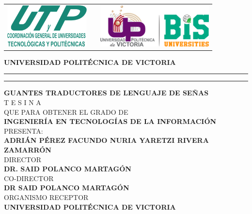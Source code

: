 \documentclass[12pt]{article}
\date{\specialdate\today}
\newcommand{\HRule}{\rule{\linewidth}{0.25mm}}
\newcommand{\ncarrera}            {Ingeniería en Tecnologías de la Información}
\newcommand{\nasesorinstitucional}{DR. SAID POLANCO MARTAGÓN}
\newcommand{\NombreAlumno}{ADRIÁN PÉREZ FACUNDO \newline NURIA YARETZI RIVERA ZAMARRÓN}
\newcommand{\NombreProyecto}{Guantes traductores de lenguaje de señas}
\newcommand{\organismoreceptor}   {Universidad Politécnica de Victoria}
\newcommand{\nasesorempresaria}   {DR SAID POLANCO MARTAGÓN}
\newcommand{\separacionCorta}{0.0cm}
\newcommand{\separacionLarga}{0.5cm}
\newcommand{\iemph}[1]{\MakeTextUppercase{#1}}
\begin{document}
\setcounter{page}{1}
\thispagestyle{empty}
\begin{center}
\begin{tabular}{cp{5cm}c}
\includegraphics[height=2.25cm]{UTYP.png} & 
& \includegraphics[height=2.25cm]{LogoUPV_2023.png}   \\
\end{tabular}
\Large \textbf{UNIVERSIDAD POLITÉCNICA DE VICTORIA}
\vspace{0.5cm}
\hrule
\vspace{0.1cm} 
\hrule
\vspace{0.5cm}
\textbf{\iemph{\NombreProyecto}} \\[\separacionLarga]
T E S I N A \\
QUE PARA OBTENER EL GRADO DE \\
\textbf{\iemph{\ncarrera}} \\[\separacionLarga]

PRESENTA: \\[\separacionCorta]
\textbf{\iemph{\NombreAlumno}}\\[\separacionLarga]
DIRECTOR \\[\separacionCorta]
\textbf{\iemph{\nasesorinstitucional}} \\[\separacionCorta]

CO-DIRECTOR \\[\separacionCorta]
\textbf{\iemph{\nasesorempresaria}} \\[\separacionCorta]

ORGANISMO RECEPTOR \\[\separacionCorta]
\textbf{\iemph{\organismoreceptor}} \\[\separacionLarga]
\end{center}
\end{document}
